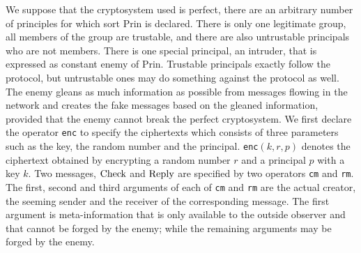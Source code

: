 \documentclass[a4paper,fleqn]{cas-dc}
\begin{document}
We suppose that the cryptosystem used is perfect, there are an arbitrary number of principles for which sort Prin is declared. There is only one legitimate group, all members of the group are trustable, and there are also untrustable principals who are not members. There is one special principal, an intruder, that is expressed as constant enemy of Prin. Trustable principals exactly follow the protocol, but untrustable ones may do something against the protocol as well. 
The enemy gleans as much information as possible from messages flowing in the network and creates the fake messages based on the gleaned information, provided that the enemy cannot break the perfect cryptosystem.
We first declare the operator \verb!enc! to specify the ciphertexts which consists of three parameters such as the key, the random number and the principal.
\verb!enc!$(k,r,p)$ denotes the ciphertext obtained by encrypting a random number $r$ and a principal $p$ with a key $k$. 
Two messages, $\rm Check$ and $\rm Reply$ are specified by two operators \verb!cm! and \verb!rm!.
The first, second and third arguments of each of \verb!cm! and \verb!rm! are the actual creator, the seeming sender and the receiver of the corresponding message. The first argument is meta-information that is only available to the outside observer and that cannot be forged by the enemy; while the remaining arguments may be forged by the enemy. 
	
\end{document}
